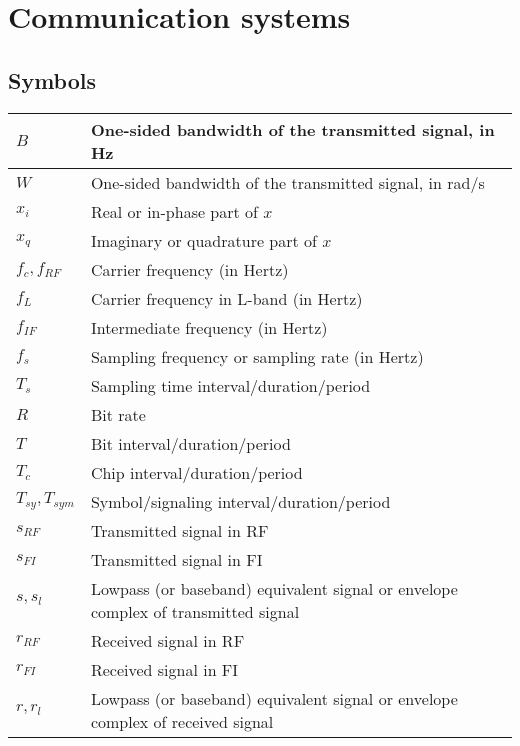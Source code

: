 \documentclass{article}
\begin{document}
\section{Communication systems}
\subsection{Symbols}
\begin{xltabular}{\textwidth}{XX}
    \(B\)                 & One-sided bandwidth of the transmitted signal, in Hz\\ \hline
    \(W\)                 & One-sided bandwidth of the transmitted signal, in rad/s\\ \hline
    \(x_i\)               & Real or in-phase part of \(x\)\\ \hline
    \(x_q\)               & Imaginary or quadrature part of \(x\)\\ \hline
    \(f_c, f_{RF}\)       & Carrier frequency (in Hertz)\\ \hline
    \(f_L\)               & Carrier frequency in L-band (in Hertz)\\ \hline
    \(f_{IF}\)            & Intermediate frequency (in Hertz)\\ \hline
    \(f_{s}\)             & Sampling frequency or sampling rate (in Hertz)\\ \hline
    \(T_{s}\)             & Sampling time interval/duration/period\\ \hline
    \(R\)                 & Bit rate\\ \hline
    \(T\)                 & Bit interval/duration/period\\ \hline
    \(T_c\)               & Chip interval/duration/period\\ \hline
    \(T_{sy}, T_{sym}\)   & Symbol/signaling\cite{proakisDigitalCommunications2007} interval/duration/period\\ \hline
    \(s_{RF}\)            & Transmitted signal in RF\\ \hline
    \(s_{FI}\)            & Transmitted signal in FI\\ \hline
    \(s, s_l\)            & Lowpass (or baseband) equivalent signal or envelope complex of transmitted signal\\ \hline
    \(r_{RF}\)            & Received signal in RF\\ \hline
    \(r_{FI}\)            & Received signal in FI\\ \hline
    \(r, r_l\)            & Lowpass (or baseband) equivalent signal or envelope complex of received signal\\ \hline

\end{xltabular}
\end{document}

